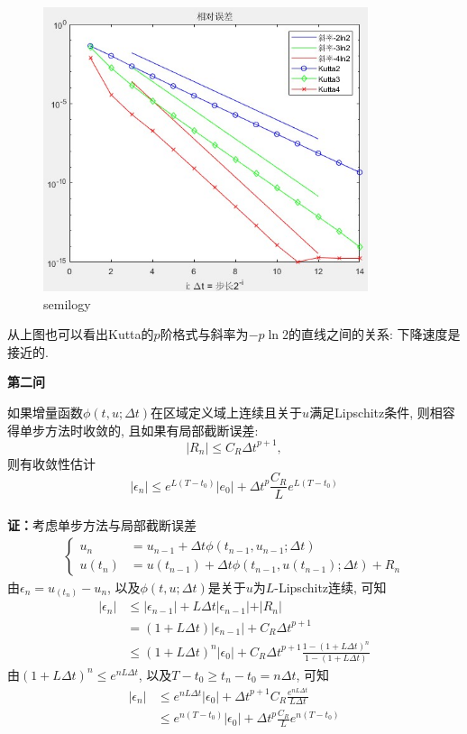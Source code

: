 \documentclass[12pt]{article}
\begin{document}
\begin{figure}[H]
	\centering
	\includegraphics[width=0.85\textwidth]{3}
	\caption{semilogy}
\end{figure}
\noindent 从上图也可以看出Kutta的$p$阶格式与斜率为$-p\ln2$的直线之间的关系: 下降速度是接近的.\\


\begin{center}
	\textbf{第二问}
\end{center}
如果增量函数$\phi(t,u;\Delta{t})$在区域定义域上连续且关于$u$满足Lipschitz条件, 则相容得单步方法时收敛的, 且如果有局部截断误差:$$\vert R_n\vert\le C_R{\Delta{t}}^{p+1},$$
\noindent 则有收敛性估计$$\vert \epsilon_n \vert\le e^{L(T-t_0)} \vert e_0 \vert+{\Delta{t}}^{p}\frac{C_R}{L}e^{L(T-t_0)}$$
\\
\textbf{证：}考虑单步方法与局部截断误差
\begin{align*}
	\begin{cases}
		u_n &= u_{n-1} + \Delta{t}\phi(t_{n-1},u_{n-1};\Delta{t})\\
		u(t_n) &= u(t_{n-1}) + \Delta{t}\phi(t_{n-1},u(t_{n-1});\Delta{t})+R_n
	\end{cases}
\end{align*}
\noindent 由$\epsilon_n=u_(t_n)-u_n$, 以及$\phi(t,u;\Delta{t})$是关于$u$为$L$-Lipschitz连续, 可知
\begin{align*}
	\vert \epsilon_n\vert &\le \vert \epsilon_{n-1} \vert + L\Delta{t}\vert \epsilon_{n-1} \vert + \vert R_n\vert \\
	&=(1+L\Delta{t})\vert \epsilon_{n-1}\vert + C_R {\Delta{t}}^{p+1}\\
	&\le (1+L\Delta{t})^n\vert \epsilon_0\vert + C_R {\Delta{t}}^{p+1}\frac{1-(1+L\Delta{t})^n}{1-(1+L\Delta{t})}
\end{align*}
\noindent 由$(1+L\Delta{t})^n \le e^{nL\Delta{t}}$, 以及$T-t_0 \ge t_n-t_0=n\Delta{t}$, 可知
\begin{align*}
	\vert \epsilon_n\vert &\le e^{nL\Delta{t}}\vert \epsilon_0\vert + {\Delta{t}}^{p+1}C_R\frac{e^{nL\Delta{t}}}{L\Delta{t}}\\
	&\le e^{n(T-t_0)}\vert \epsilon_0\vert +{\Delta{t}}^p \frac{C_R}{L}e^{n(T-t_0)}
\end{align*}

	
	
	
	
\end{document}

